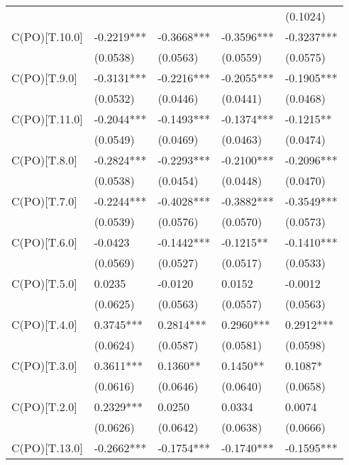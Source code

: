 \begin{table}
\begin{center}
\begin{tabular}{lllll}
                         &            &            &            & (0.1024)    \\
C(PO)[T.10.0]            & -0.2219*** & -0.3668*** & -0.3596*** & -0.3237***  \\
                         & (0.0538)   & (0.0563)   & (0.0559)   & (0.0575)    \\
C(PO)[T.9.0]             & -0.3131*** & -0.2216*** & -0.2055*** & -0.1905***  \\
                         & (0.0532)   & (0.0446)   & (0.0441)   & (0.0468)    \\
C(PO)[T.11.0]            & -0.2044*** & -0.1493*** & -0.1374*** & -0.1215**   \\
                         & (0.0549)   & (0.0469)   & (0.0463)   & (0.0474)    \\
C(PO)[T.8.0]             & -0.2824*** & -0.2293*** & -0.2100*** & -0.2096***  \\
                         & (0.0538)   & (0.0454)   & (0.0448)   & (0.0470)    \\
C(PO)[T.7.0]             & -0.2244*** & -0.4028*** & -0.3882*** & -0.3549***  \\
                         & (0.0539)   & (0.0576)   & (0.0570)   & (0.0573)    \\
C(PO)[T.6.0]             & -0.0423    & -0.1442*** & -0.1215**  & -0.1410***  \\
                         & (0.0569)   & (0.0527)   & (0.0517)   & (0.0533)    \\
C(PO)[T.5.0]             & 0.0235     & -0.0120    & 0.0152     & -0.0012     \\
                         & (0.0625)   & (0.0563)   & (0.0557)   & (0.0563)    \\
C(PO)[T.4.0]             & 0.3745***  & 0.2814***  & 0.2960***  & 0.2912***   \\
                         & (0.0624)   & (0.0587)   & (0.0581)   & (0.0598)    \\
C(PO)[T.3.0]             & 0.3611***  & 0.1360**   & 0.1450**   & 0.1087*     \\
                         & (0.0616)   & (0.0646)   & (0.0640)   & (0.0658)    \\
C(PO)[T.2.0]             & 0.2329***  & 0.0250     & 0.0334     & 0.0074      \\
                         & (0.0626)   & (0.0642)   & (0.0638)   & (0.0666)    \\
C(PO)[T.13.0]            & -0.2662*** & -0.1754*** & -0.1740*** & -0.1595***  \\

\end{tabular}
\end{center}
\end{table}
